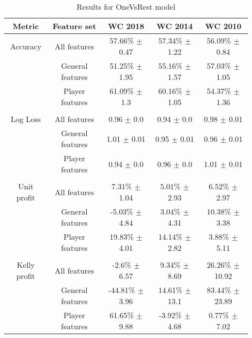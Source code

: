 \begin{table}
    \caption{Results for OneVsRest model}
    \begin{tabular}{| c  c| c| c| c|}
        \hline
        Metric& Feature set & \textbf{WC 2018} & \textbf{WC 2014} & \textbf{WC 2010}\\
        \hline
        Accuracy & All features & 57.66\% $\pm$ 0.47 & 57.34\% $\pm$ 1.22 & 56.09\% $\pm$ 0.84 \\
 & General features & 51.25\% $\pm$ 1.95 & 55.16\% $\pm$ 1.57 & 57.03\% $\pm$ 1.05 \\
 & Player features & 61.09\% $\pm$ 1.3 & 60.16\% $\pm$ 1.05 & 54.37\% $\pm$ 1.36 \\
 &  & & &  \\
Log Loss & All features & 0.96 $\pm$ 0.0 & 0.94 $\pm$ 0.0 & 0.98 $\pm$ 0.01 \\
 & General features & 1.01 $\pm$ 0.01 & 0.95 $\pm$ 0.01 & 0.96 $\pm$ 0.01 \\
 & Player features & 0.94 $\pm$ 0.0 & 0.96 $\pm$ 0.0 & 1.01 $\pm$ 0.01 \\
 &  & & &  \\
Unit profit & All features & 7.31\% $\pm$ 1.04 & 5.01\% $\pm$ 2.93 & 6.52\% $\pm$ 2.97 \\
 & General features & -5.03\% $\pm$ 4.84 & 3.04\% $\pm$ 4.31 & 10.38\% $\pm$ 3.38 \\
 & Player features & 19.83\% $\pm$ 4.01 & 14.14\% $\pm$ 2.82 & 3.88\% $\pm$ 5.11 \\
 &  & & &  \\
Kelly profit & All features & -2.6\% $\pm$ 6.57 & 9.34\% $\pm$ 8.69 & 26.26\% $\pm$ 10.92 \\
 & General features & -44.81\% $\pm$ 3.96 & 14.61\% $\pm$ 13.1 & 83.44\% $\pm$ 23.89 \\
 & Player features & 61.65\% $\pm$ 9.88 & -3.92\% $\pm$ 4.68 & 0.77\% $\pm$ 7.02 \\
 \hline
    \end{tabular}
    \label{table:onevsrestresults}
\end{table}